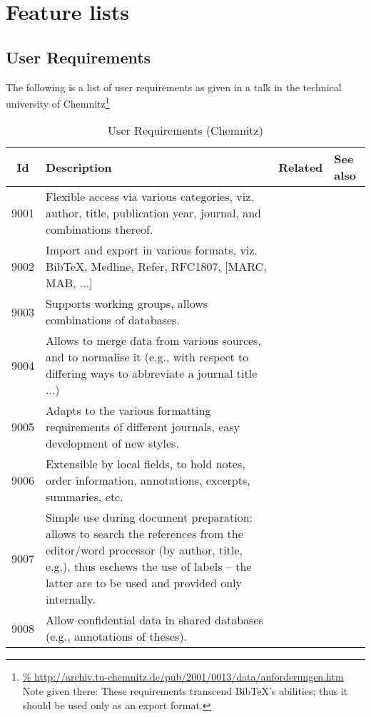
\chapter{Feature lists}
\label{cha:commfeat}


\section{User Requirements}
\label{sec:userrequire}
\newcommand{\tabcaption}{}
\newcommand{\tablabel}{}
\newenvironment{featlist}[2]{\small%
  \renewcommand{\tabcaption}{#1}\renewcommand{\tablabel}{#2}
  \begin{table}[ht]
    \centering
    \begin{tabular}[t]{|c|p{.5\textwidth}|p{2cm}|p{2cm}|}
      \firsthline Id& Description& Related& See also\\ \hline}
    {\hline   \end{tabular}   \caption{\tabcaption}   \label{\tablabel}
  \end{table}}


 The following is a list of user requirements as given in a talk in the
 technical university of Chemnitz\footnote{\url{%
     http://archiv.tu-chemnitz.de/pub/2001/0013/data/anforderungen.htm}
   Note given there: These requirements transcend BibTeX's abilities;
   thus it should be used only as an export format.}


 \begin{featlist}{User Requirements (Chemnitz)}{tab:usreqchem}
   
9001&  Flexible access via various categories, viz. author, title,
   publication year, journal, and combinations thereof.&&\\

9002&  Import and export in various formats, viz. BibTeX, Medline,
   Refer, RFC1807, [MARC, MAB, ...]&&\\

9003&  Supports working groups, allows combinations of databases.&&\\

9004&  Allows to merge data from various sources, and to normalise it
   (e.g., with respect to differing ways to abbreviate a journal title
   ...) &&\\

9005&  Adapts to the various formatting requirements of different
   journals, easy development of new styles.&&\\

9006&  Extensible by local fields, to hold notes, order information,
   annotations, excerpts, summaries, etc.&&\\

9007& Simple use during document preparation: allows to search the
   references from the editor/word processor (by author, title, e.g.),
   thus eschews the use of labels -- the latter are to be used and
   provided only internally. \seet{wpintegration} &&\\

9008& Allow confidential data in shared databases (e.g., annotations
   of theses).&&\\
 \end{featlist}


